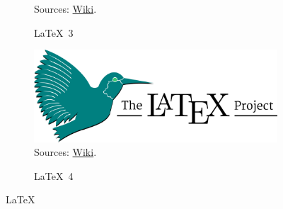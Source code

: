 \documentclass[utf8,12pt]{article} %
\begin{document}
\begin{figure}[htbp]
\begin{subfigure}[b]{0.45\textwidth}
		\footnotesize{Sources: 
		\href{https://en.wikipedia.org/wiki/LaTeX}{Wiki}.}
		\caption{\LaTeX~3} 
		\label{LaTeX 3} %
	\end{subfigure}
	\hfill
	\begin{subfigure}[b]{0.45\textwidth}
		\centering
		\includegraphics[width=\textwidth]{Fig/LaTeX}
		\footnotesize{Sources: 
		\href{https://en.wikipedia.org/wiki/LaTeX}{Wiki}.}
		\caption{\LaTeX~4} 
		\label{LaTeX 4} %
	\end{subfigure}	
	\caption{\LaTeX} 
	\label{LaTeX} %
\end{figure}
%
%
\end{document}
